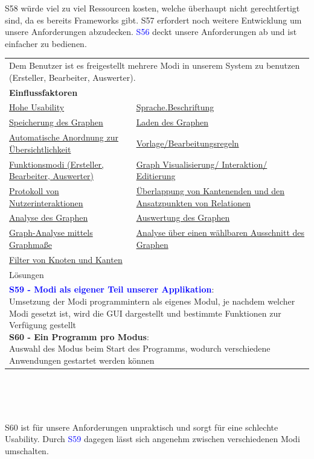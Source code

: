 \documentclass[enabledeprecatedfontcommands,fontsize=11pt,paper=a4,twoside]{scrartcl}
\newcounter{one}
\newcommand{\cb}[1]{{\textcolor{blue}{#1}}}
\begin{document}
\begin{onehalfspace}
	S58 würde viel zu viel Ressourcen kosten, welche überhaupt nicht gerechtfertigt sind, da es bereits Frameworks gibt. S57 erfordert noch weitere Entwicklung um unsere Anforderungen abzudecken. \cb{S56} deckt unsere Anforderungen ab und ist einfacher zu bedienen.
\end{onehalfspace}

\newpage
\begin{tabular} {|p{8cm} p{8cm}|}
	\hline
	\rowcolor{prob}\multicolumn{2}{|l|}{\parbox{16cm}{\textbf{23: Umsetzung der Funktionsmodi}}} \\  \hline\hline 
	\multicolumn{2}{|l|}{\parbox{16cm}{Dem Benutzer ist es freigestellt mehrere Modi in unserem System zu benutzen (Ersteller, Bearbeiter, Auswerter).}}\rule{0pt}{4ex}\\ [1ex] \hline
	\multicolumn{2}{|l|}{\textbf{Einflussfaktoren}}\\
	\hyperlink {g}{Hohe Usability}&
	\hyperlink {hh}{Sprache.Beschriftung} \\
	\hyperlink {v}{Speicherung des Graphen} &
	\hyperlink {w}{Laden des Graphen} \\
	\hyperlink {x}{Automatische Anordnung zur Übersichtlichkeit} &
	\hyperlink {y}{Vorlage/Bearbeitungsregeln} \\
	\hyperlink {z}{Funktionsmodi (Ersteller, Bearbeiter, Auswerter)} &
	\hyperlink {aa}{Graph Visualisierung/ Interaktion/ Editierung}\\
	\hyperlink {bb}{Protokoll von Nutzerinteraktionen} &
	\hyperlink {cc}{Überlappung von Kantenenden und den Ansatzpunkten von Relationen} \\
	\hyperlink {oo}{Analyse des Graphen} &
	\hyperlink {pp}{Auswertung des Graphen} \\
	\hyperlink {qq}{Graph-Analyse mittels Graphmaße} & 
	\hyperlink {rr}{Analyse über einen wählbaren Ausschnitt des Graphen} \\ 
	\hyperlink {ss}{Filter von Knoten und Kanten} &
	\\ \hline
	\multicolumn{2}{|l|}{Lösungen} \\
	\multicolumn{2}{|l|}{\parbox{16cm}{
			\textbf{\cb{\hypertarget{uuu}{S59 - Modi als eigener Teil unserer Applikation}}}: \\
			Umsetzung der Modi programmintern als eigenes Modul, je nachdem welcher Modi gesetzt ist, wird die GUI dargestellt und bestimmte Funktionen zur Verfügung gestellt \\
			\textbf{S60 - Ein Programm pro Modus}: \\
			Auswahl des Modus beim Start des Programms, wodurch verschiedene Anwendungen gestartet werden können
	} }\\ [7ex] \hline
\end{tabular}\\ \\ \\
\begin{onehalfspace}
	S60 ist für unsere Anforderungen unpraktisch und sorgt für eine schlechte Usability. Durch \cb{S59} dagegen lässt sich angenehm zwischen verschiedenen Modi umschalten. 
\end{onehalfspace}
\end{document}
